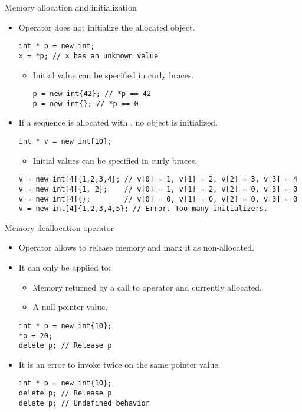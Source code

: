 \begin{frame}[t,fragile]{Memory allocation and initialization}
\begin{itemize}
  \item Operator  does not initialize the allocated object.
\begin{lstlisting}
int * p = new int;
x = *p; // x has an unknown value
\end{lstlisting}
    \begin{itemize}
      \item Initial value can be specified in curly braces.
\begin{lstlisting}
p = new int{42}; // *p == 42
p = new int{}; // *p == 0
\end{lstlisting}
    \end{itemize}

  \vfill\pause
  \item If a sequence is allocated with , no object is initialized.
\begin{lstlisting}
int * v = new int[10];
\end{lstlisting}
    \begin{itemize}
      \item Initial values can be specified in curly braces.
    \end{itemize}
\begin{lstlisting}
v = new int[4]{1,2,3,4}; // v[0] = 1, v[1] = 2, v[2] = 3, v[3] = 4
v = new int[4]{1, 2};    // v[0] = 1, v[1] = 2, v[2] = 0, v[3] = 0
v = new int[4]{};        // v[0] = 0, v[1] = 0, v[2] = 0, v[3] = 0
v = new int[4]{1,2,3,4,5}; // Error. Too many initializers.
\end{lstlisting}
\end{itemize}
\end{frame}

\begin{frame}[fragile]{Memory deallocation operator}
\begin{itemize}
  \item Operator  allows to release memory and mark it
        as non-allocated.
  \item It can only be applied to:
    \begin{itemize}
      \item Memory returned by a call to operator  and currently allocated.
      \item A null pointer value.
    \end{itemize}
\begin{lstlisting}
int * p = new int{10};
*p = 20;
delete p; // Release p
\end{lstlisting}
  \item It is an error to invoke twice  on the same pointer value.
\begin{lstlisting}
int * p = new int{10};
delete p; // Release p
delete p; // Undefined behavior
\end{lstlisting}
\end{itemize}
\end{frame}

